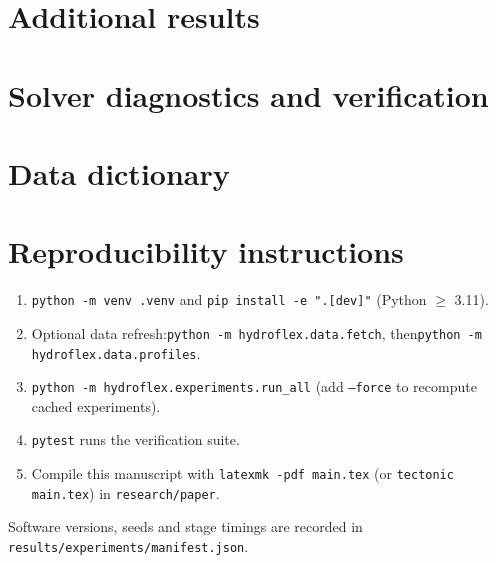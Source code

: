 \FloatBarrier
\section{Additional results}
\label{app:results}

\FloatBarrier
\section{Solver diagnostics and verification}
\label{app:solver}

\FloatBarrier
\section{Data dictionary}
\label{app:data}

\FloatBarrier
\section{Reproducibility instructions}
\label{app:repro}
\begin{enumerate}
\item \texttt{python -m venv .venv} and \texttt{pip install -e ".[dev]"} (Python $\ge$ 3.11).
\item Optional data refresh:\newline \texttt{python -m hydroflex.data.fetch}, then\newline \texttt{python -m hydroflex.data.profiles}.
\item \texttt{python -m hydroflex.experiments.run\_all} (add \texttt{--force} to recompute cached experiments).
\item \texttt{pytest} runs the verification suite.
\item Compile this manuscript with \texttt{latexmk -pdf main.tex} (or \texttt{tectonic main.tex}) in \texttt{research/paper}.
\end{enumerate}
Software versions, seeds and stage timings are recorded in \texttt{results/experiments/manifest.json}.
